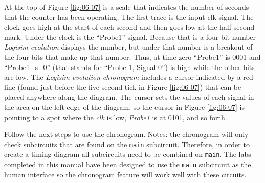 At the top of Figure \ref{fig:06-07} is a scale that indicates the number of seconds that the counter has been operating. The first trace is the input clk signal. The clock goes high at the start of each second and then goes low at the half-second mark. Under the clock is the ``Probe1'' signal. Because that is a four-bit number \textit{Logisim-evolution} displays the number, but under that number is a breakout of the four bits that make up that number. Thus, at time zero ``Probe1'' is 0001 and ``Probe1\_s\_0'' (that stands for ``Probe 1, Signal 0'') is high while the other bits are low. The \textit{Logisim-evolution} \textit{chronogram} includes a cursor indicated by a red line (found just before the five second tick in Figure \ref{fig:06-07}) that can be placed anywhere along the diagram. The cursor sets the values of each signal in the area on the left edge of the diagram, so the cursor in Figure \ref{fig:06-07} is pointing to a spot where the \textit{clk} is low, \textit{Probe1} is at 0101, and so forth.

Follow the next steps to use the chronogram. Notes: the chronogram will only check subcircuits that are found on the  \lstinline[columns=fixed]|main| subcircuit. Therefore, in order to create a timing diagram all subcircuits need to be combined on \lstinline[columns=fixed]|main|. The labs completed in this manual have been designed to use the \lstinline[columns=fixed]|main| subcircuit as the human interface so the chronogram feature will work well with these circuits. 

